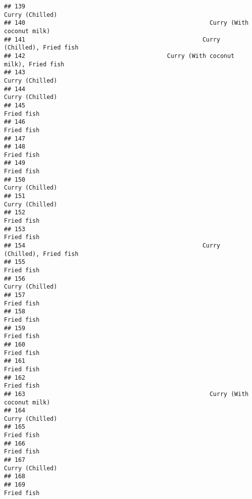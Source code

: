 \documentclass[
]{article}
\begin{document}
\begin{verbatim}
## 139                                                              Curry (Chilled)
## 140                                                    Curry (With coconut milk)
## 141                                                  Curry (Chilled), Fried fish
## 142                                        Curry (With coconut milk), Fried fish
## 143                                                              Curry (Chilled)
## 144                                                              Curry (Chilled)
## 145                                                                   Fried fish
## 146                                                                   Fried fish
## 147                                                                             
## 148                                                                   Fried fish
## 149                                                                   Fried fish
## 150                                                              Curry (Chilled)
## 151                                                              Curry (Chilled)
## 152                                                                   Fried fish
## 153                                                                   Fried fish
## 154                                                  Curry (Chilled), Fried fish
## 155                                                                   Fried fish
## 156                                                              Curry (Chilled)
## 157                                                                   Fried fish
## 158                                                                   Fried fish
## 159                                                                   Fried fish
## 160                                                                   Fried fish
## 161                                                                   Fried fish
## 162                                                                   Fried fish
## 163                                                    Curry (With coconut milk)
## 164                                                              Curry (Chilled)
## 165                                                                   Fried fish
## 166                                                                   Fried fish
## 167                                                              Curry (Chilled)
## 168                                                                             
## 169                                                                   Fried fish

\end{verbatim}
\end{document}
